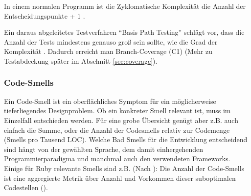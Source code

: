 
In einem normalen Programm ist die Zyklomatische Komplexität die Anzahl der Entscheidungspunkte + 1 \citep[S. 314]{mccabe_complexity_1976}.

Ein daraus abgeleitetes Testverfahren "`Basis Path Testing"' schlägt vor, dass die Anzahl der Tests mindestens genauso groß sein sollte, wie die Grad der Komplexität \citep[S. 318]{mccabe_complexity_1976}. Dadurch erreicht man Branch-Coverage (C1) (Mehr zu Testabdeckung später im Abschnitt \ref{sec:coverage}).

\subsubsection{Code-Smells}

  Ein Code-Smell ist ein oberflächliches Symptom für ein möglicherweise tieferliegendes Designproblem. Ob ein konkreter Smell relevant ist, muss im Einzelfall entschieden werden. Für eine grobe Übersicht genügt aber z.B. auch einfach die Summe, oder die Anzahl der Codesmells relativ zur Codemenge (Smells pro Tausend LOC). Welche Bad Smells für die Entwicklung entscheidend sind hängt von der gewählten Sprache, dem damit einhergehenden Programmierparadigma und manchmal auch den verwendeten Frameworks. Einige für Ruby relevante Smells sind z.B. (Nach \citep{kevin_rutherford_code_2010}):
    Die Anzahl der Code-Smells ist eine aggregierte Metrik über Anzahl und Vorkommen dieser suboptimalen Codestellen ().

